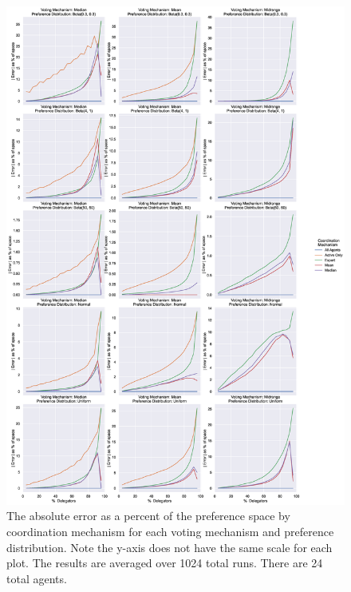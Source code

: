 %
%


\makeappendices

\renewcommand\thefigure{A.\arabic{figure}}

\begin{figure}[p]
    \centering
    \includegraphics[scale=0.35]
    {content/chapter2/figures/distribution_different_scale_error_as_percent_of_space_abs_mean}
    \caption{
        The absolute error as a percent of the preference space by coordination
        mechanism for each voting mechanism and preference distribution.
        Note the y-axis does not have the same scale for each plot.
        The results are averaged over 1024 total runs.
        There are 24 total agents.
    }
    \label{fig:distribution-different-scale-error-as-percent-of-space-abs-mean}
\end{figure}

